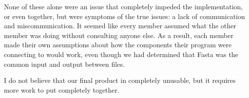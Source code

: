 \documentclass[10pt,letterpaper]{article}
\begin{document}
None of these alone were an issue that completely impeded the implementation, or even together, but were symptoms of the true issues:   a lack of communication and miscommunication.
It seemed like every member assumed what the other member was doing without consulting anyone else.
As a result, each member made their own assumptions about how the components their program were connecting to would work, even though we had determined that Fasta was the common input and output between files.


I do not believe that our final product in completely unusable, but it requires more work to put completely together.



\end{document}
